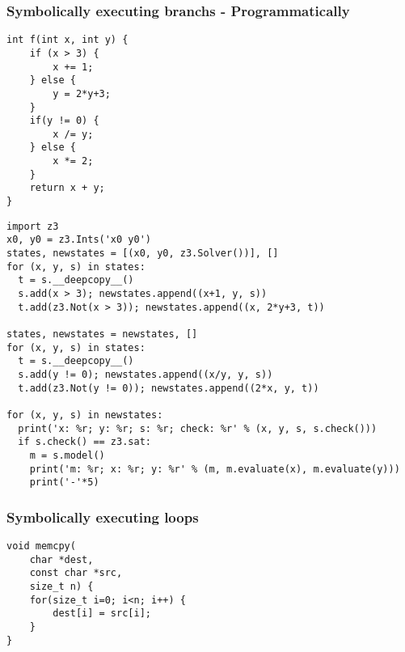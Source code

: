 \documentclass[aspectratio=169]{beamer}
\begin{document}
\begin{frame}[fragile]
\frametitle{Symbolically executing branchs - Programmatically}
\begin{minipage}{0.25\textwidth}
\begin{Verbatim}[fontsize=\scriptsize, frame=single]
int f(int x, int y) {
    if (x > 3) {
        x += 1;
    } else {
        y = 2*y+3;
    }
    if(y != 0) {
        x /= y;
    } else {
        x *= 2;
    }
    return x + y;
}
\end{Verbatim}
\end{minipage}
\begin{minipage}{0.74\textwidth}
\begin{Verbatim}[fontsize=\scriptsize, frame=single]
import z3
x0, y0 = z3.Ints('x0 y0')
states, newstates = [(x0, y0, z3.Solver())], []
for (x, y, s) in states:
  t = s.__deepcopy__()
  s.add(x > 3); newstates.append((x+1, y, s))
  t.add(z3.Not(x > 3)); newstates.append((x, 2*y+3, t))

states, newstates = newstates, []
for (x, y, s) in states:
  t = s.__deepcopy__()
  s.add(y != 0); newstates.append((x/y, y, s))
  t.add(z3.Not(y != 0)); newstates.append((2*x, y, t))

for (x, y, s) in newstates:
  print('x: %r; y: %r; s: %r; check: %r' % (x, y, s, s.check()))
  if s.check() == z3.sat:
    m = s.model()
    print('m: %r; x: %r; y: %r' % (m, m.evaluate(x), m.evaluate(y)))
    print('-'*5)
\end{Verbatim}
\end{minipage}
\end{frame}

\begin{frame}[fragile]
\frametitle{Symbolically executing loops}
\begin{minipage}{0.35\textwidth}
\begin{Verbatim}[fontsize=\scriptsize, frame=single]
void memcpy(
    char *dest,
    const char *src,
    size_t n) {
    for(size_t i=0; i<n; i++) {
        dest[i] = src[i];
    }
}
\end{Verbatim}
\end{minipage}
\begin{minipage}{0.6\textwidth}
\end{minipage}
\end{frame}
\end{document}
